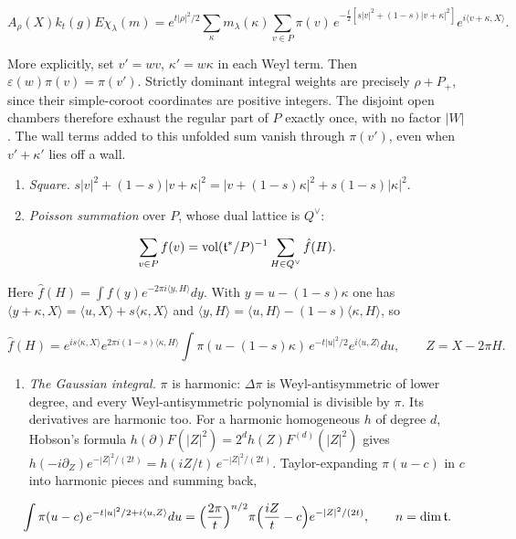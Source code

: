 \documentclass[11pt,a4paper]{article}
\newcommand{\tightlist}{\setlength{\itemsep}{0pt}\setlength{\parskip}{0pt}}
\begin{document}
\[A_\rho(X)k_t(g)E\chi_\lambda(m)=e^{t|\rho|^2/2}\sum_\kappa m_\lambda(\kappa)
\sum_{v\in P}\pi(v)\,e^{-\frac t2[s|v|^2+(1-s)|v+\kappa|^2]}e^{i\langle v+\kappa,X\rangle}.\]

More explicitly, set \(v'=wv\), \(\kappa'=w\kappa\) in each Weyl term.
Then \(\varepsilon(w)\pi(v)=\pi(v')\). Strictly dominant integral
weights are precisely \(\rho+P_+\), since their simple-coroot
coordinates are positive integers. The disjoint open chambers therefore
exhaust the regular part of \(P\) exactly once, with no factor \(|W|\).
The wall terms added to this unfolded sum vanish through \(\pi(v')\),
even when \(v'+\kappa'\) lies off a wall.

\begin{enumerate}
\def\labelenumi{(\roman{enumi})}
\setcounter{enumi}{2}
\item
  \emph{Square.}
  \(s|v|^2+(1-s)|v+\kappa|^2=|v+(1-s)\kappa|^2+s(1-s)|\kappa|^2\).
\item
  \emph{Poisson summation} over \(P\), whose dual lattice is \(Q^\vee\):
\end{enumerate}

\[\sum_{v\in P}f(v)={\rm vol}(\mathfrak t^*/P)^{-1}\sum_{H\in Q^\vee}\hat f(H).\]

Here \(\hat f(H)=\int f(y)e^{-2\pi i\langle y,H\rangle}dy\). With
\(y=u-(1-s)\kappa\) one has
\(\langle y+\kappa,X\rangle=\langle u,X\rangle+s\langle\kappa,X\rangle\)
and
\(\langle y,H\rangle=\langle u,H\rangle-(1-s)\langle\kappa,H\rangle\),
so

\[\hat f(H)=e^{is\langle\kappa,X\rangle}e^{2\pi i(1-s)\langle\kappa,H\rangle}\int\pi(u-(1-s)\kappa)\,
e^{-t|u|^2/2}e^{i\langle u,Z\rangle}du,\qquad Z=X-2\pi H.\]

\begin{enumerate}
\def\labelenumi{(\alph{enumi})}
\setcounter{enumi}{21}
\tightlist
\item
  \emph{The Gaussian integral.} \(\pi\) is harmonic: \(\Delta\pi\) is
  Weyl-antisymmetric of lower degree, and every Weyl-antisymmetric
  polynomial is divisible by \(\pi\). Its derivatives are harmonic too.
  For a harmonic homogeneous \(h\) of degree \(d\), Hobson's formula
  \(h(\partial)F(|Z|^2)=2^dh(Z)F^{(d)}(|Z|^2)\) gives
  \(h(-i\partial_Z)e^{-|Z|^2/(2t)}=h(iZ/t)\,e^{-|Z|^2/(2t)}\).
  Taylor-expanding \(\pi(u-c)\) in \(c\) into harmonic pieces and
  summing back,
\end{enumerate}

\[\int\pi(u-c)\,e^{-t|u|^2/2+i\langle u,Z\rangle}du=\Bigl(\frac{2\pi}t\Bigr)^{n/2}
\pi\Bigl(\frac{iZ}t-c\Bigr)e^{-|Z|^2/(2t)},\qquad n=\dim\mathfrak t.\]
\end{document}
